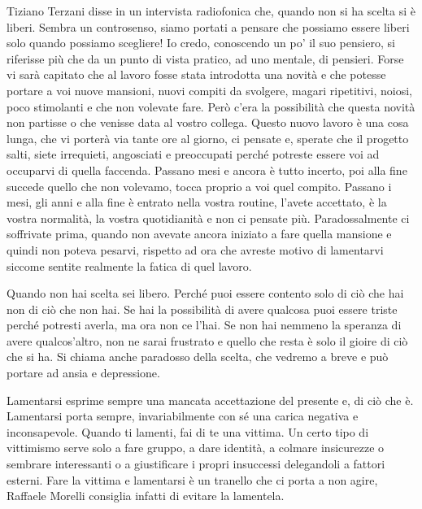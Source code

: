 \documentclass[12pt]{book} %
\begin{document}
Tiziano Terzani disse in un intervista radiofonica che, quando non si ha scelta si è liberi. Sembra un controsenso,
siamo portati a pensare che possiamo essere liberi solo quando possiamo scegliere! Io credo, conoscendo un
po' il suo pensiero, si riferisse più che da un punto di vista pratico, ad uno mentale, di
pensieri. Forse vi sarà capitato che al lavoro fosse stata introdotta una novità e che potesse portare a voi nuove
mansioni, nuovi compiti da svolgere, magari ripetitivi, noiosi, poco stimolanti e che non volevate fare. Però
c'era la possibilità che questa novità non partisse o che venisse data al vostro collega. Questo
nuovo lavoro è una cosa lunga, che vi porterà via tante ore al giorno, ci pensate e, sperate che il progetto salti,
siete irrequieti, angosciati e preoccupati perché potreste essere voi ad occuparvi di quella faccenda. Passano mesi e
ancora è tutto incerto, poi alla fine succede quello che non volevamo, tocca proprio a voi quel compito. Passano i
mesi, gli anni e alla fine è entrato nella vostra routine, l'avete accettato, è la vostra
normalità, la vostra quotidianità e non ci pensate più. Paradossalmente ci soffrivate prima, quando non avevate ancora
iniziato a fare quella mansione e quindi non poteva pesarvi, rispetto ad ora che avreste motivo di lamentarvi siccome
sentite realmente la fatica di quel lavoro.

Quando non hai scelta sei libero. Perché puoi essere contento solo di ciò che hai non di ciò che non hai. Se hai la
possibilità di avere qualcosa puoi essere triste perché potresti averla, ma ora non ce l'hai. Se
non hai nemmeno la speranza di avere qualcos'altro, non ne sarai frustrato e quello che resta è solo il gioire di ciò
che si ha. Si chiama anche paradosso della scelta, che vedremo a breve e può portare ad ansia e depressione.

Lamentarsi esprime sempre una mancata accettazione del presente e, di ciò che è. Lamentarsi porta sempre,
invariabilmente con sé una carica negativa e inconsapevole. Quando ti lamenti, fai di te una vittima. Un certo tipo di
vittimismo serve solo a fare gruppo, a dare identità, a colmare insicurezze o sembrare interessanti o a giustificare i
propri insuccessi delegandoli a fattori esterni. Fare la vittima e lamentarsi è un tranello che ci porta a non agire, Raffaele Morelli consiglia infatti di evitare la lamentela.
\end{document}
